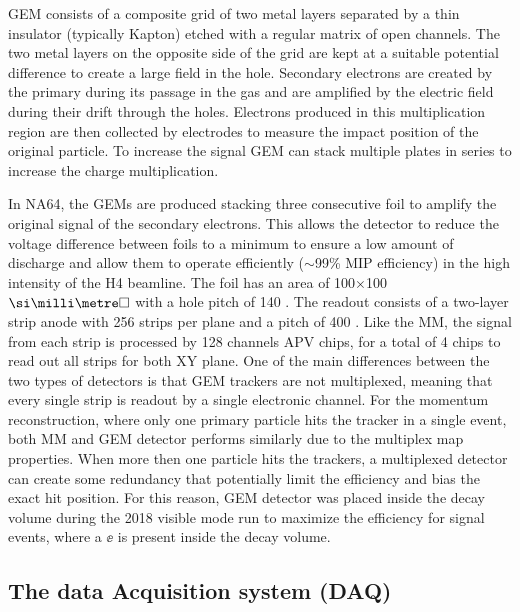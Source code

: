 GEM consists of a composite grid of two metal layers separated by a thin insulator (typically Kapton) etched with a regular matrix of open channels. The two metal layers on the opposite side of the grid are kept at a suitable potential difference to create a large field in the hole. Secondary electrons are created by the primary during its passage in the gas and are amplified by the electric field during their drift through the holes. Electrons produced in this multiplication region are then collected by electrodes to measure the impact position of the original particle. To increase the signal GEM can stack multiple plates in series to increase the charge multiplication.

In NA64, the GEMs are produced stacking three consecutive foil to amplify the original signal of the secondary electrons. This allows the detector to reduce the voltage difference between foils to a minimum to ensure a low amount of discharge and allow them to operate efficiently ($\sim$99\% MIP efficiency) in the high intensity of the H4 beamline. The foil has an area of 100$\times$100 $\mms$ with a hole pitch of 140 \mum. The readout consists of a two-layer strip anode with 256 strips per plane and a pitch of 400 \mum. Like the MM, the signal from each strip is processed by 128 channels APV chips, for a total of 4 chips to read out all strips for both XY plane.
One of the main differences between the two types of detectors is that GEM trackers are not multiplexed, meaning that every single strip is readout by a single electronic channel. For the momentum reconstruction, where only one primary particle hits the tracker in a single event, both MM and GEM detector performs similarly due to the multiplex map properties. When more then one particle hits the trackers, a multiplexed detector can create some redundancy that potentially limit the efficiency and bias the exact hit position. For this reason, GEM detector was placed inside the decay volume during the 2018 visible mode run to maximize the efficiency for signal events, where a $\ee$ is present inside the decay volume.

\subsection{The data Acquisition system (DAQ)}
\label{ch2:sec:daq}

